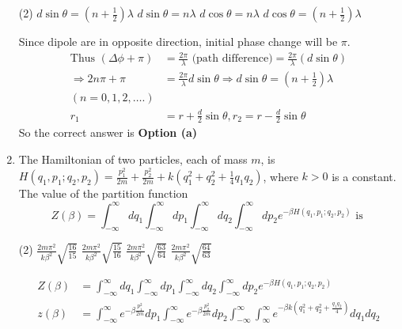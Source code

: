 \begin{enumerate}
 \begin{tasks}(2)
	\task[\textbf{a.}] $d \sin \theta=\left(n+\frac{1}{2}\right) \lambda$
	\task[\textbf{b.}]$d \sin \theta=n \lambda$
	\task[\textbf{c.}]$d \cos \theta=n \lambda$
	\task[\textbf{d.}]  $d \cos \theta=\left(n+\frac{1}{2}\right) \lambda$
\end{tasks}
\begin{answer}
 Since dipole are in opposite direction, initial phase change will be $\pi$.
	\begin{align*}
	\text{Thus }
	(\Delta \phi+\pi)&=\frac{2 \pi}{\lambda}\text{ (path difference)}
	 =\frac{2 \pi}{\lambda}(d \sin \theta)\\
	\Rightarrow 2 n \pi+\pi&=\frac{2 \pi}{\lambda} d \sin \theta \Rightarrow d \sin \theta=\left(n+\frac{1}{2}\right) \lambda\\
	(n=0,1,2, \ldots .)&\\
	r_{1}&=r+\frac{d}{2} \sin \theta, r_{2}=r-\frac{d}{2} \sin \theta
	\end{align*}
	So the correct answer is \textbf{Option (a)}
\end{answer}
\item The Hamiltonian of two particles, each of mass $m$, is $H\left(q_{1}, p_{1} ; q_{2}, p_{2}\right)=\frac{p_{1}^{2}}{2 m}+\frac{p_{2}^{2}}{2 m}+k\left(q_{1}^{2}+q_{2}^{2}+\frac{1}{4} q_{1} q_{2}\right)$, where $k>0$ is a constant. The value of the partition function
$$
Z(\beta)=\int_{-\infty}^{\infty} d q_{1} \int_{-\infty}^{\infty} d p_{1} \int_{-\infty}^{\infty} d q_{2} \int_{-\infty}^{\infty} d p_{2} e^{-\beta H\left(q_{1}, p_{1} ; q_{2}, p_{2}\right)} \text { is }
$$
 \begin{tasks}(2)
	\task[\textbf{a.}] $\frac{2 m \pi^{2}}{k \beta^{2}} \sqrt{\frac{16}{15}}$
	\task[\textbf{b.}]$\frac{2 m \pi^{2}}{k \beta^{2}} \sqrt{\frac{15}{16}}$
	\task[\textbf{c.}]$\frac{2 m \pi^{2}}{k \beta^{2}} \sqrt{\frac{63}{64}}$
	\task[\textbf{d.}]  $\frac{2 m \pi^{2}}{k \beta^{2}} \sqrt{\frac{64}{63}}$
\end{tasks}
\begin{answer}
	\begin{align*}
	Z(\beta)&=\int_{-\infty}^{\infty} d q_{1} \int_{-\infty}^{\infty} d p_{1} \int_{-\infty}^{\infty} d q_{2} \int_{-\infty}^{\infty} d p_{2} e^{-\beta H\left(q_{1}, p_{1} ; q_{2}, p_{2}\right)}\\
	z(\beta)&=\int_{-\infty}^{\infty} e^{-\beta \frac{p_{1}^{2}}{2 m}} d p_{1} \int_{-\infty}^{\infty} e^{-\beta \frac{p_{2}^{2}}{2 m}} d p_{2} \int_{-\infty}^{\infty} \int_{\infty}^{\infty} e^{-\beta k\left(q_{1}^{2}+q_{2}^{2}+\frac{q_{1} q_{2}}{4}\right)} d q_{1} d q_{2}\\

\end{align*}
\end{answer}
\end{enumerate}
